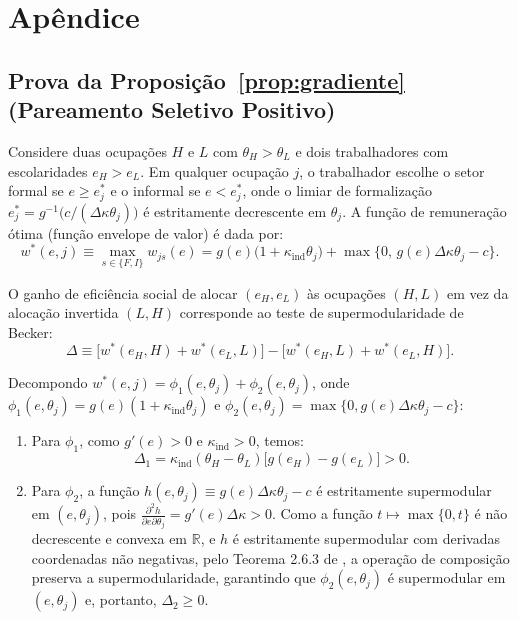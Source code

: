 \section{Apêndice}

\setcounter{table}{0}
\renewcommand{\thetable}{A\arabic{table}}

\subsection{Prova da Proposição~\ref{prop:gradiente} (Pareamento Seletivo Positivo)}

Considere duas ocupações $H$ e $L$ com $\theta_H > \theta_L$ e dois trabalhadores com escolaridades $e_H > e_L$. Em qualquer ocupação $j$, o trabalhador escolhe o setor formal se $e \ge e_j^*$ e o informal se $e < e_j^*$, onde o limiar de formalização $e_j^* = g^{-1}\big(c / (\Delta\kappa \theta_j)\big)$ é estritamente decrescente em $\theta_j$. A função de remuneração ótima (função envelope de valor) é dada por:
\begin{equation}
    w^*(e, j) \equiv \max_{s \in \{F, I\}} w_{js}(e) = g(e)\big(1 + \kappa_{\text{ind}}\theta_j\big)
    + \max\big\{0, \, g(e)\Delta\kappa\theta_j - c\big\}.
    \label{eq:envelope}
\end{equation}

O ganho de eficiência social de alocar $(e_H, e_L)$ às ocupações $(H, L)$ em vez da alocação invertida $(L, H)$ corresponde ao teste de supermodularidade de Becker:
\begin{equation}
    \Delta \equiv \big[w^*(e_H, H) + w^*(e_L, L)\big] - \big[w^*(e_H, L) + w^*(e_L, H)\big].
\end{equation}

Decompondo $w^*(e, j) = \phi_1(e, \theta_j) + \phi_2(e, \theta_j)$, onde $\phi_1(e, \theta_j) = g(e)(1 + \kappa_{\text{ind}}\theta_j)$ e $\phi_2(e, \theta_j) = \max\{0, g(e)\Delta\kappa\theta_j - c\}$:
\begin{enumerate}
    \item Para $\phi_1$, como $g'(e) > 0$ e $\kappa_{\text{ind}} > 0$, temos:
    \begin{equation}
        \Delta_1 = \kappa_{\text{ind}}(\theta_H - \theta_L)\big[g(e_H) - g(e_L)\big] > 0.
    \end{equation}
    \item Para $\phi_2$, a função $h(e, \theta_j) \equiv g(e)\Delta\kappa\theta_j - c$ é estritamente supermodular em $(e, \theta_j)$, pois $\frac{\partial^2 h}{\partial e \partial \theta_j} = g'(e)\Delta\kappa > 0$. Como a função $t \mapsto \max\{0, t\}$ é não decrescente e convexa em $\mathbb{R}$, e $h$ é estritamente supermodular com derivadas coordenadas não negativas, pelo Teorema 2.6.3 de \citet{topkis1998supermodularity}, a operação de composição preserva a supermodularidade, garantindo que $\phi_2(e, \theta_j)$ é supermodular em $(e, \theta_j)$ e, portanto, $\Delta_2 \ge 0$.
\end{enumerate}

